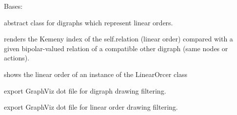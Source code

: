 \documentclass[letterpaper,10pt,english]{sphinxmanual}
\begin{document}

\begin{fulllineitems}
\label{techDoc:linearOrders.LinearOrder}
Bases: {\hyperref[techDoc:digraphs.Digraph]{}}

abstract class for digraphs which represent
linear orders.

\begin{fulllineitems}
\label{techDoc:linearOrders.LinearOrder.computeKemenyIndex}
renders the Kemeny index of the self.relation (linear order)
compared with a given bipolar-valued relation of a compatible
other digraph (same nodes or actions).

\end{fulllineitems}


\begin{fulllineitems}
\label{techDoc:linearOrders.LinearOrder.computeOrder}
shows the linear order of an instance of the LinearOrcer class

\end{fulllineitems}


\begin{fulllineitems}
\label{techDoc:linearOrders.LinearOrder.exportDigraphGraphViz}
export GraphViz dot file for digraph drawing filtering.

\end{fulllineitems}


\begin{fulllineitems}
\label{techDoc:linearOrders.LinearOrder.exportGraphViz}
export GraphViz dot file  for linear order drawing filtering.


\end{fulllineitems}
\end{fulllineitems}
\end{document}
